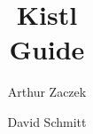 \documentclass[a4paper,12pt]{report}
\begin{document}
\addtolength{\textheight}{2cm}
\addtolength{\topmargin}{-1cm}

\newenvironment{CS}{\tt\begin{tabbing}\nopagebreak}{\end{tabbing}}
\newcommand{\kw}{\it}
\newcommand{\new}{\bf}
\newcommand{\comment}{\it}

\title{Kistl\\Guide}
\author{Arthur Zaczek}
\author{David Schmitt}

\pagestyle{empty}



\tableofcontents

\setlength{\headheight}{15pt}

\pagestyle{fancy}

\renewcommand{\chaptermark}[1]{\markboth{\chaptername\ \thechapter.\ #1}{}}
\renewcommand{\sectionmark}[1]{\markright{\thesection.\ #1}}


% 

% 







\listoffigures


\end{document}
